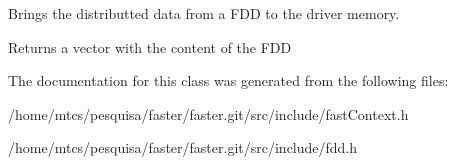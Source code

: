 Brings the distributted data from a F\+DD to the driver memory. 

\begin{DoxyReturn}{Returns}
a vector with the content of the F\+DD 
\end{DoxyReturn}


The documentation for this class was generated from the following files\+:\begin{DoxyCompactItemize}
\item 
/home/mtcs/pesquisa/faster/faster.\+git/src/include/fast\+Context.\+h\item 
/home/mtcs/pesquisa/faster/faster.\+git/src/include/fdd.\+h\end{DoxyCompactItemize}
